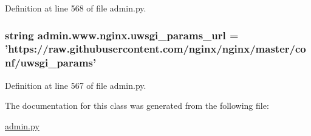 Definition at line 568 of file admin.\-py.

\hypertarget{classadmin_1_1www_1_1nginx_aec1e7959ddfe6598718fb6c8c9d72320}{
\subsubsection[{uwsgi\-\_\-params\-\_\-url}]{\setlength{\rightskip}{0pt plus 5cm}string admin.\-www.\-nginx.\-uwsgi\-\_\-params\-\_\-url = 'https\-://raw.\-githubusercontent.\-com/{\bf nginx}/{\bf nginx}/master/conf/uwsgi\-\_\-params'\hspace{0.3cm}{\ttfamily [static]}}}\label{classadmin_1_1www_1_1nginx_aec1e7959ddfe6598718fb6c8c9d72320}


Definition at line 567 of file admin.\-py.



The documentation for this class was generated from the following file\-:\begin{DoxyCompactItemize}
\item 
\hyperlink{admin_8py}{admin.\-py}\end{DoxyCompactItemize}
